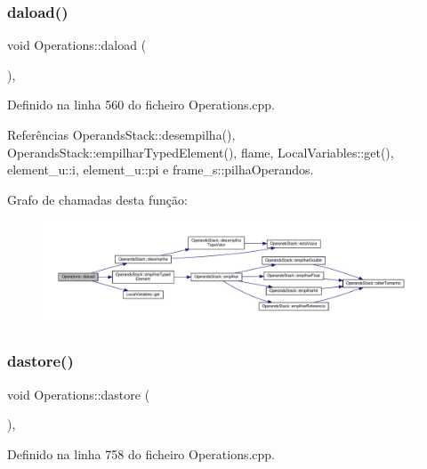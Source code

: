 \subsubsection{\texorpdfstring{daload()}{daload()}}
{\footnotesize\ttfamily void Operations\+::daload (\begin{DoxyParamCaption}{ }\end{DoxyParamCaption})\hspace{0.3cm}{\ttfamily [static]}, {\ttfamily [private]}}



Definido na linha 560 do ficheiro Operations.\+cpp.



Referências Operands\+Stack\+::desempilha(), Operands\+Stack\+::empilhar\+Typed\+Element(), flame, Local\+Variables\+::get(), element\+\_\+u\+::i, element\+\_\+u\+::pi e frame\+\_\+s\+::pilha\+Operandos.

Grafo de chamadas desta função\+:
\nopagebreak
\begin{figure}[H]
\begin{center}
\leavevmode
\includegraphics[width=350pt]{classOperations_a63691de547749780c372e285bd6a97bc_cgraph}
\end{center}
\end{figure}
\mbox{\label{classOperations_a9735fdb8ba4ea2d7b8b32e8d0a5d2f72}} 
\subsubsection{\texorpdfstring{dastore()}{dastore()}}
{\footnotesize\ttfamily void Operations\+::dastore (\begin{DoxyParamCaption}{ }\end{DoxyParamCaption})\hspace{0.3cm}{\ttfamily [static]}, {\ttfamily [private]}}



Definido na linha 758 do ficheiro Operations.\+cpp.




